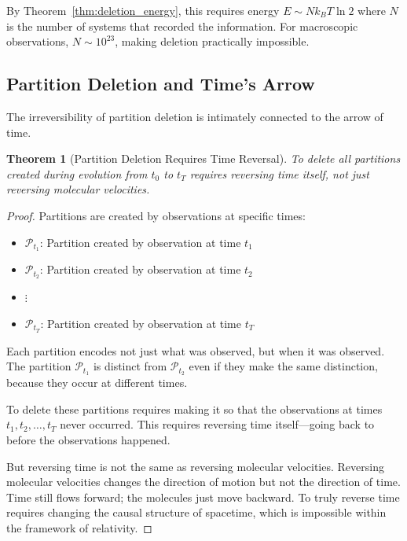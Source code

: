 \documentclass[twocolumn,10pt]{article}
\newtheorem{theorem}{Theorem}[section]
\theoremstyle{definition}
\theoremstyle{remark}
\begin{document}
\vspace{0.2cm}
\noindent By Theorem~\ref{thm:deletion_energy}, this requires energy $E \sim N k_B T \ln 2$ where $N$ is the number of systems that recorded the information. For macroscopic observations, $N \sim 10^{23}$, making deletion practically impossible.

\subsection{Partition Deletion and Time's Arrow}

The irreversibility of partition deletion is intimately connected to the arrow of time.

\begin{theorem}[Partition Deletion Requires Time Reversal]
\label{thm:deletion_time_reversal}
To delete all partitions created during evolution from $t_0$ to $t_T$ requires reversing time itself, not just reversing molecular velocities.
\end{theorem}

\begin{proof}
Partitions are created by observations at specific times:
\begin{itemize}
\item $\mathcal{P}_{t_1}$: Partition created by observation at time $t_1$
\item $\mathcal{P}_{t_2}$: Partition created by observation at time $t_2$
\item $\vdots$
\item $\mathcal{P}_{t_T}$: Partition created by observation at time $t_T$
\end{itemize}

Each partition encodes not just what was observed, but when it was observed. The partition $\mathcal{P}_{t_1}$ is distinct from $\mathcal{P}_{t_2}$ even if they make the same distinction, because they occur at different times.

To delete these partitions requires making it so that the observations at times $t_1, t_2, \ldots, t_T$ never occurred. This requires reversing time itself—going back to before the observations happened.

But reversing time is not the same as reversing molecular velocities. Reversing molecular velocities changes the direction of motion but not the direction of time. Time still flows forward; the molecules just move backward. To truly reverse time requires changing the causal structure of spacetime, which is impossible within the framework of relativity.
\end{proof}
\end{document}
